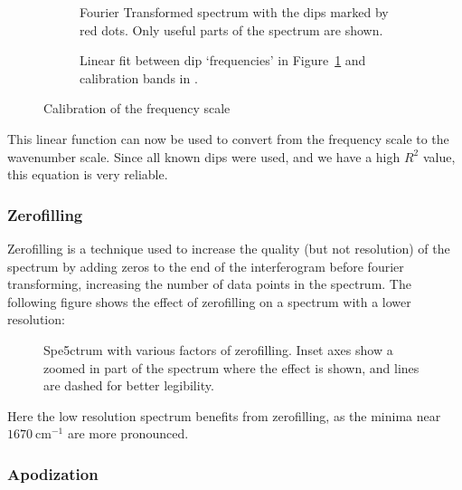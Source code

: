 \documentclass{article}
\begin{document}
\begin{figure}[h!]
	\centering
	\begin{subfigure}[t]{0.48\textwidth}
		\centering
		\scalebox{0.5}{}
		\caption{Fourier Transformed spectrum with the dips marked by red dots. Only useful parts of the spectrum are shown.}
		\label{fig:air32000dips}
	\end{subfigure} \hfill
	\begin{subfigure}[t]{0.48\textwidth}
		\centering
		\scalebox{0.5}{}
		\caption{Linear fit between dip `frequencies' in Figure~\ref{fig:air32000dips} and calibration bands in \cite{riede_rotationvibration}.}
		\label{fig:linearfit_calibration}
	\end{subfigure}
	\caption{Calibration of the frequency scale}
	\label{fig:calibration}
\end{figure}

This linear function can now be used to convert from the frequency scale to the wavenumber scale. Since all known dips were used, and we have a high $R^2$ value, this equation is very reliable.  

\pagebreak{}

\subsubsection{Zerofilling}

Zerofilling is a technique used to increase the quality (but not resolution) of the spectrum by adding zeros to the end of the interferogram before fourier transforming, increasing the number of data points in the spectrum. The following figure shows the effect of zerofilling on a spectrum with a lower resolution:

 \begin{figure}[h!]
	\centering
	\scalebox{0.7}{}
	\caption{Spe5ctrum with various factors of zerofilling. Inset axes show a zoomed in part of the spectrum where the effect is shown, and lines are dashed for better legibility.}
	\label{fig:zerofilling}
\end{figure}

Here the low resolution spectrum benefits from zerofilling, as the minima near $1670 \ \text{cm}^{-1}$ are more pronounced.

\pagebreak{}

\subsubsection{Apodization}
\end{document}
